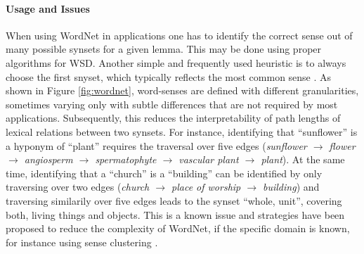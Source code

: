 \paragraph*{Usage and Issues}
When using WordNet in applications one has to identify the correct sense out of many possible synsets for a given lemma. This may be done using proper algorithms for \ac{WSD}. Another simple and frequently used heuristic is to always choose the first snyset, which typically reflects the most common sense \citep{mccarthy2004using}. As shown in Figure \ref{fig:wordnet}, word-senses are defined with different granularities, sometimes varying only with subtle differences that are not required by most applications. Subsequently, this reduces the interpretability of path lengths of lexical relations between two synsets. For instance, identifying that ``sunflower'' is a hyponym of ``plant'' requires the traversal over five edges (\textit{sunflower $\rightarrow$ flower $\rightarrow$ angiosperm $\rightarrow$ spermatophyte $\rightarrow$ vascular plant $\rightarrow$ plant}). At the same time, identifying that a ``church'' is a ``building'' can be identified by only traversing over two edges (\textit{church $\rightarrow$ place of worship $\rightarrow$ building}) and traversing similarily over five edges leads to the synset ``whole, unit'', covering both, living things and objects. This is a known issue \citep{resnik1995using} and  strategies have been proposed to reduce the complexity of WordNet, if the specific domain is known, for instance using sense clustering \citep{prakash2007learning}.

